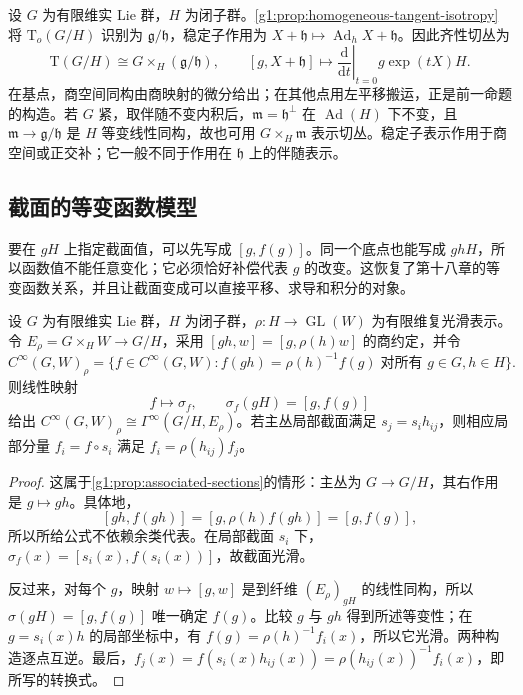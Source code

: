 \begin{example}\label{g1:exm:homogeneous-tangent-associated}
	设 \(G\) 为有限维实 Lie 群，\(H\) 为闭子群。\cref{g1:prop:homogeneous-tangent-isotropy}将 \(\mathrm{T}_o(G/H)\) 识别为 \(\mathfrak g/\mathfrak h\)，稳定子作用为 \(X+\mathfrak h\mapsto\operatorname{Ad}_hX+\mathfrak h\)。因此齐性切丛为
	\[
		\mathrm{T}(G/H)\cong G\times_H(\mathfrak g/\mathfrak h),\qquad
		[g,X+\mathfrak h]\longmapsto
		\left.\frac{\mathrm{d}}{\mathrm{d}t}\right|_{t=0}g\exp(tX)H.
	\]
	在基点，商空间同构由商映射的微分给出；在其他点用左平移搬运，正是前一命题的构造。若 \(G\) 紧，取伴随不变内积后，\(\mathfrak m=\mathfrak h^\perp\) 在 \(\operatorname{Ad}(H)\) 下不变，且 \(\mathfrak m\to\mathfrak g/\mathfrak h\) 是 \(H\) 等变线性同构，故也可用 \(G\times_H\mathfrak m\) 表示切丛。稳定子表示作用于商空间或正交补；它一般不同于作用在 \(\mathfrak h\) 上的伴随表示。
\end{example}

\subsection{截面的等变函数模型}
\label{g1:subsec:2003:02}
要在 \(gH\) 上指定截面值，可以先写成 \([g,f(g)]\)。同一个底点也能写成 \(ghH\)，所以函数值不能任意变化；它必须恰好补偿代表 \(g\) 的改变。这恢复了第十八章的等变函数关系，并且让截面变成可以直接平移、求导和积分的对象。

\begin{proposition}\label{g1:prop:equivariant-functions-sections}
	设 \(G\) 为有限维实 Lie 群，\(H\) 为闭子群，\(\rho:H\to\operatorname{GL}(W)\) 为有限维复光滑表示。令 \(E_\rho=G\times_H W\to G/H\)，采用 \([gh,w]=[g,\rho(h)w]\) 的商约定，并令
	\[
		C^\infty(G,W)_\rho
		=\{f\in C^\infty(G,W):f(gh)=\rho(h)^{-1}f(g)
		\;\text{对所有 }g\in G,h\in H\}.
	\]
	则线性映射
	\[
		f\longmapsto\sigma_f,\qquad
		\sigma_f(gH)=[g,f(g)]
	\]
	给出 \(C^\infty(G,W)_\rho\cong\Gamma^\infty(G/H,E_\rho)\)。若主丛局部截面满足 \(s_j=s_i h_{ij}\)，则相应局部分量 \(f_i=f\circ s_i\) 满足 \(f_i=\rho(h_{ij})f_j\)。
\end{proposition}
\begin{proof}
	这属于\cref{g1:prop:associated-sections}的情形：主丛为 \(G\to G/H\)，其右作用是 \(g\mapsto gh\)。具体地，
	\[
		[gh,f(gh)]=[g,\rho(h)f(gh)]=[g,f(g)],
	\]
	所以所给公式不依赖余类代表。在局部截面 \(s_i\) 下，\(\sigma_f(x)=[s_i(x),f(s_i(x))]\)，故截面光滑。

	反过来，对每个 \(g\)，映射 \(w\mapsto[g,w]\) 是到纤维 \((E_\rho)_{gH}\) 的线性同构，所以 \(\sigma(gH)=[g,f(g)]\) 唯一确定 \(f(g)\)。比较 \(g\) 与 \(gh\) 得到所述等变性；在 \(g=s_i(x)h\) 的局部坐标中，有 \(f(g)=\rho(h)^{-1}f_i(x)\)，所以它光滑。两种构造逐点互逆。最后，\(f_j(x)=f(s_i(x)h_{ij}(x))=\rho(h_{ij}(x))^{-1}f_i(x)\)，即所写的转换式。
\end{proof}

